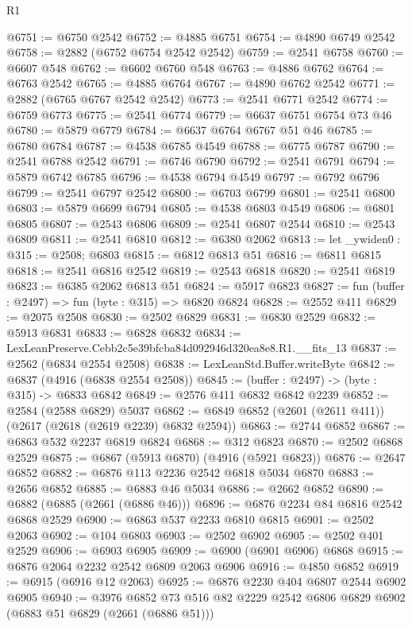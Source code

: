 \begin{lexlean}{R1}
\begin{coremodule}
@6751 := @6750 @2542
@6752 := @4885 @6751
@6754 := @4890 @6749 @2542
@6758 := @2882 (@6752 @6754 @2542 @2542)
@6759 := @2541 @6758
@6760 := @6607 @548
@6762 := @6602 @6760 @548
@6763 := @4886 @6762
@6764 := @6763 @2542
@6765 := @4885 @6764
@6767 := @4890 @6762 @2542
@6771 := @2882 (@6765 @6767 @2542 @2542)
@6773 := @2541 @6771 @2542
@6774 := @6759 @6773
@6775 := @2541 @6774
@6779 := @6637 @6751 @6754 @73 @46
@6780 := @5879 @6779
@6784 := @6637 @6764 @6767 @51 @46
@6785 := @6780 @6784
@6787 := @4538 @6785 @4549
@6788 := @6775 @6787
@6790 := @2541 @6788 @2542
@6791 := @6746 @6790
@6792 := @2541 @6791
@6794 := @5879 @6742 @6785
@6796 := @4538 @6794 @4549
@6797 := @6792 @6796
@6799 := @2541 @6797 @2542
@6800 := @6703 @6799
@6801 := @2541 @6800
@6803 := @5879 @6699 @6794
@6805 := @4538 @6803 @4549
@6806 := @6801 @6805
@6807 := @2543 @6806
@6809 := @2541 @6807 @2544
@6810 := @2543 @6809
@6811 := @2541 @6810
@6812 := @6380 @2062
@6813 := let _ywiden0 : @315 := @2508; @6803
@6815 := @6812 @6813 @51
@6816 := @6811 @6815
@6818 := @2541 @6816 @2542
@6819 := @2543 @6818
@6820 := @2541 @6819
@6823 := @6385 @2062 @6813 @51
@6824 := @5917 @6823
@6827 := fun (buffer : @2497) => fun (byte : @315) => @6820 @6824
@6828 := @2552 @411
@6829 := @2075 @2508
@6830 := @2502 @6829
@6831 := @6830 @2529
@6832 := @5913 @6831
@6833 := @6828 @6832
@6834 := LexLeanPreserve.Cebb2c5e39bfcba84d092946d320ea8e8.R1.__fits_13
@6837 := @2562 (@6834 @2554 @2508)
@6838 := LexLeanStd.Buffer.writeByte
@6842 := @6837 (@4916 (@6838 @2554 @2508))
@6845 := (buffer : @2497) -> (byte : @315) -> @6833 @6842
@6849 := @2576 @411 @6832 @6842 @2239
@6852 := @2584 (@2588 @6829) @5037
@6862 := @6849 @6852 (@2601 (@2611 @411)) (@2617 (@2618 (@2619 @2239) @6832 @2594))
@6863 := @2744 @6852
@6867 := @6863 @532 @2237 @6819 @6824
@6868 := @312 @6823
@6870 := @2502 @6868 @2529
@6875 := @6867 (@5913 @6870) (@4916 (@5921 @6823))
@6876 := @2647 @6852
@6882 := @6876 @113 @2236 @2542 @6818 @5034 @6870
@6883 := @2656 @6852
@6885 := @6883 @46 @5034
@6886 := @2662 @6852
@6890 := @6882 (@6885 (@2661 (@6886 @46)))
@6896 := @6876 @2234 @84 @6816 @2542 @6868 @2529
@6900 := @6863 @537 @2233 @6810 @6815
@6901 := @2502 @2063
@6902 := @104 @6803
@6903 := @2502 @6902
@6905 := @2502 @401 @2529
@6906 := @6903 @6905
@6909 := @6900 (@6901 @6906) @6868
@6915 := @6876 @2064 @2232 @2542 @6809 @2063 @6906
@6916 := @4850 @6852
@6919 := @6915 (@6916 @12 @2063)
@6925 := @6876 @2230 @404 @6807 @2544 @6902 @6905
@6940 := @3976
    @6852
    @73
    @516
    @82
    @2229
    @2542
    @6806
    @6829
    @6902
    (@6883 @51 @6829 (@2661 (@6886 @51)))

\end{coremodule}
\end{lexlean}
